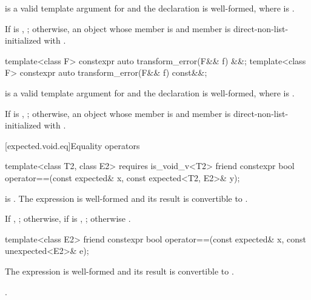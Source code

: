 \begin{itemdescr}
\pnum
\mandates
{} is a valid template argument for  and the declaration  is well-formed, where  is .

\pnum
\returns
If  is , ; otherwise, an  object whose  member is  and  member is direct-non-list-initialized with .
\end{itemdescr}

%
\begin{itemdecl}
template<class F> constexpr auto transform_error(F&& f) &&;
template<class F> constexpr auto transform_error(F&& f) const&&;
\end{itemdecl}

\begin{itemdescr}
\pnum
\mandates
{} is a valid template argument for  and the declaration  is well-formed, where  is .

\pnum
\returns
If  is , ; otherwise, an  object whose  member is  and  member is direct-non-list-initialized with .
\end{itemdescr}

[expected.void.eq]{Equality operators}

%
\begin{itemdecl}
template<class T2, class E2>
  requires is_void_v<T2>
friend constexpr bool operator==(const expected& x, const expected<T2, E2>& y);
\end{itemdecl}

\begin{itemdescr}
\pnum
\mandates
{} is . The expression  is well-formed and its result is convertible to .

\pnum
\returns
If , ; otherwise, if  is , ; otherwise .
\end{itemdescr}

%
\begin{itemdecl}
template<class E2>
friend constexpr bool operator==(const expected& x, const unexpected<E2>& e);
\end{itemdecl}

\begin{itemdescr}
\pnum
\mandates
The expression  is well-formed and its result is convertible to .

\pnum
\returns
{}.
\end{itemdescr}
